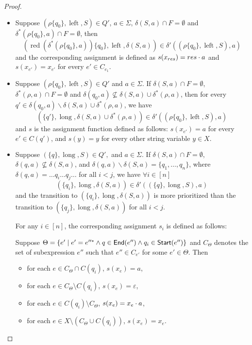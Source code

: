 \documentclass[sigplan,review,anonymous]{acmart}\settopmatter{printfolios=true,printccs=false,printacmref=false}
\newcommand{\tmop}[1]{\ensuremath{\operatorname{#1}}}
\newcommand\ssym{{\sf Start}}
\newcommand\esym{{\sf End}}
\begin{document}
\begin{proof}
\begin{itemize}
  
  \item Suppose $(\rho \{ q_0 \}, \tmop{left}, S) \in Q'$, $a \in \Sigma$,
  $\delta (S, a) \cap F = \emptyset$ and $\delta^{\ast} (\rho \{ q_0 \}, a) \cap F =
  \emptyset$, then
  \[ (\tmop{red} (\delta^{\ast} (\rho \{ q_0 \}, a)) \{ q_0 \}, \tmop{left}, \delta
     (S, a)) \in \delta' ((\rho \{ q_0 \}, \tmop{left}, S), a) \]
  and the corresponding assignment is defined as $s(x_{res}) = res \cdot a$ and $s(x_{e'})=x_{e'}$ for
  every $e' \in C_{e_1}$.
  
  \item Suppose $(\rho \{ q_0 \}, \tmop{left}, S) \in Q'$ and $a \in \Sigma$.
  If $\delta (S, a) \cap F = \emptyset$, $\delta^{\ast} (\rho, a) \cap F = \emptyset$
  and $\delta (q_0, a) \nsubseteq \delta (S, a) \cup \delta^{\ast} (\rho, a)$, then
  for every $q' \in \delta (q_0, a) \backslash \delta (S, a) \cup \delta^{\ast}
  (\rho, a)$, we have
  \[ (\{ q' \}, \tmop{long}, \delta (S, a) \cup \delta^{\ast} (\rho, a)) \in \delta'
     ((\rho \{ q_0 \}, \tmop{left}, S), a) \]
  and $s$ is the assignment function defined as follows: $s(x_{e'}) = a$ for every $e'  \in C(q')$, and $s(y)=y$ for every other string variable $y \in X$.
  
  \item Suppose $(\{ q \}, \tmop{long}, S) \in Q',$ and $a \in \Sigma$. If
  $\delta (S, a) \cap F = \emptyset$, $\delta (q, a) \nsubseteq \delta (S,
  a)$, and $\delta (q, a) \backslash \delta (S, a) = \{ q_1, \ldots,
  q_n \}$, where $\delta (q, a) = \ldots q_i \ldots q_j \ldots$ for all $i < j$,
  we have $\forall i \in [n]$
  \[ (\{ q_i \}, \tmop{long}, \delta (S, a)) \in \delta' ((\{ q \},
     \tmop{long}, S), a) \]
  and the transition to $(\{ q_i \}, \tmop{long}, \delta (S, a))$ is more prioritized than the transition to
  $(\{ q_j \}, \tmop{long}, \delta (S, a))$ for all $i < j$. 
  
  For any $i \in [n]$, the corresponding assignment $s_i$ is defined as follows:
  
  Suppose $\Theta = \{e' \mid e' = e''^*  \wedge
  q \in \esym(e'') \wedge q_i \in \ssym(e'') \}$ and $C_{\Theta}$ denotes the set of subexpression $e''$ such that $e'' \in C_{e'}$ for some $e' \in \Theta$.
Then 
\begin{itemize}
\item for each $e \in C_{\Theta} \cap C(q_i)$, $s(x_e) = a$,
%
\item for each $e \in C_{\Theta} \setminus C(q_i)$, $s(x_e) = \varepsilon$, 
%
\item for each $e \in C(q_i) \setminus C_\Theta$, $s(x_e) = x_e \cdot a$,
%
\item for each $e \in X \setminus (C_\Theta \cup C(q_i))$, $s(x_e)= x_e$.
\end{itemize}


\end{itemize}
\end{proof}
\end{document}
